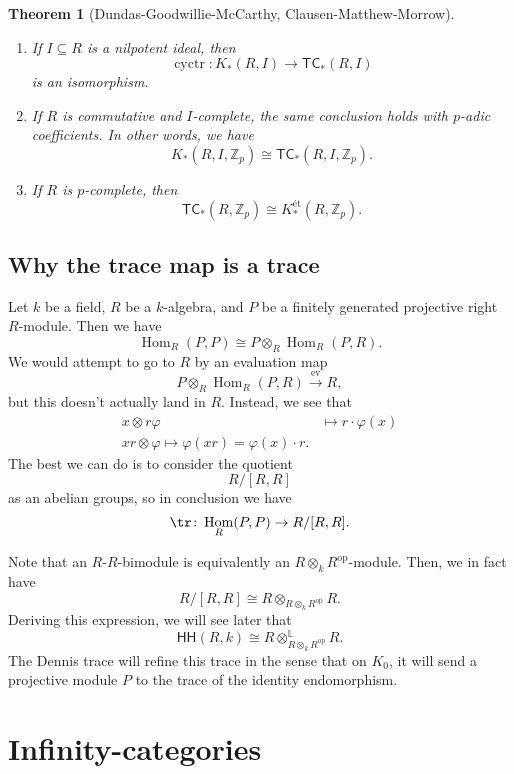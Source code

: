 \documentclass[10pt]{amsart}
\newtheorem{thm}{Theorem}[section]
\theoremstyle{definition}
\theoremstyle{remark}
\theoremstyle{plain}
\theoremstyle{definition}
\theoremstyle{remark}
\newcommand{\Z}{\mathbb{Z}}
\renewcommand{\L}{\mathbb{L}}
\newcommand{\on}[1]{\operatorname{#1}}
\newcommand{\ms}[1]{\mathsf{#1}}
\newcommand{\1}{\mathbf{1}}
\newcommand{\2}{\mathbf{2}}
\newcommand{\3}{\mathbf{3}}
\newcommand{\TC}{\ms{TC}}
\newcommand{\HH}{\ms{HH}}
\DeclareMathOperator{\Hom}{Hom}
\DeclareMathOperator{\ev}{ev}
\DeclareMathOperator{\op}{op}
\begin{document}
\begin{thm}[Dundas-Goodwillie-McCarthy, Clausen-Matthew-Morrow]\leavevmode
    \begin{enumerate}
        \item If $I \subseteq R$ is a nilpotent ideal, then 
        \[ \on{cyctr} \colon K_*(R,I) \to \TC_*(R, I) \]
        is an isomorphism.
        \item If $R$ is commutative and $I$-complete, the same conclusion holds with $p$-adic coefficients. In other words, we have
        \[
            K_*(R, I, \Z_p) \cong \TC_*(R, I, \Z_p).
        \]
        \item If $R$ is $p$-complete, then 
        \[ \TC_*(R, \Z_p) \cong K_*^{\text{\'et}}(R, \Z_p). \]
    \end{enumerate}
\end{thm}

\subsection{Why the trace map is a trace}%
\label{sub:Why the trace map is a trace}

Let $k$ be a field, $R$ be a $k$-algebra, and $P$ be a finitely generated projective right $R$-module. Then we have
\[ \Hom_R(P, P) \cong P \otimes_R \Hom_R(P, R). \]
We would attempt to go to $R$ by an evaluation map
\[ P \otimes_R \Hom_R(P, R) \xrightarrow{\ev} R, \]
but this doesn't actually land in $R$. Instead, we see that
\begin{align*}
    x \otimes r \varphi &\mapsto r \cdot \varphi(x) \\
    xr \otimes \varphi \mapsto \varphi(xr) = \varphi(x) \cdot r.
\end{align*}
The best we can do is to consider the quotient
\[ R / [R,R] \]
as an abelian groups, so in conclusion we have
\[ \tr \colon \Hom_R(P, P) \to R/[R,R]. \]

Note that an $R$-$R$-bimodule is equivalently an $R \otimes_k R^{\op}$-module. Then, we in fact have
\[ R/[R,R] \cong R \otimes_{R \otimes_k R^{\op}} R. \]
Deriving this expression, we will see later that
\[ \HH(R, k) \cong R \otimes^{\L}_{R \otimes_k R^{\op}} R. \]
The Dennis trace will refine this trace in the sense that on $K_0$, it will send a projective module $P$ to the trace of the identity endomorphism.

\section{Infinity-categories}%
\label{sec:Infinity-categories}
\end{document}
